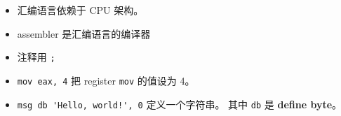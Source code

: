 
\begin{issues}
\issueDraft
\end{issues}

\begin{itemize}
\item 汇编语言依赖于 CPU 架构。
\item assembler 是汇编语言的编译器
\item 注释用 \verb|;|
\item \verb|mov eax, 4| 把 register \verb|mov| 的值设为 4。
\item \verb|msg db 'Hello, world!', 0| 定义一个字符串。 其中 \verb|db| 是 \textbf{define byte}。
\end{itemize}
